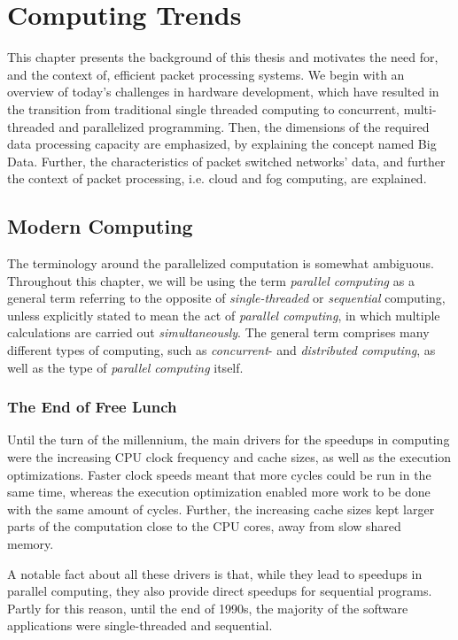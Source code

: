 \chapter{Computing Trends}
\label{chapter:computing-trends}
This chapter presents the background of this thesis and motivates the need for, and the context of, efficient packet processing systems. We begin with an overview of today's challenges in hardware development, which have resulted in the transition from traditional single threaded computing to concurrent, multi-threaded and parallelized programming. Then, the dimensions of the required data processing capacity are emphasized, by explaining the concept named Big Data. Further, the characteristics of packet switched networks' data, and further the context of packet processing, i.e. cloud and fog computing, are explained.

\section{Modern Computing}
The terminology around the parallelized computation is somewhat ambiguous. Throughout this chapter, we will be using the term \emph{parallel computing} as a general term referring to the opposite of \emph{single-threaded} or \emph{sequential} computing, unless explicitly stated to mean the act of \emph{parallel computing}, in which multiple calculations are carried out \emph{simultaneously}. The general term comprises many different types of computing, such as \emph{concurrent}- and \emph{distributed computing}, as well as the type of \emph{parallel computing} itself.

\subsection{The End of Free Lunch}
\label{subsection:the-end-of-free-lunch}
Until the turn of the millennium, the main drivers for the speedups in computing were the increasing CPU clock frequency and cache sizes, as well as the execution optimizations. Faster clock speeds meant that more cycles could be run in the same time, whereas the execution optimization enabled more work to be done with the same amount of cycles. Further, the increasing cache sizes kept larger parts of the computation close to the CPU cores, away from slow shared memory.~\cite{Sutter:2005:FLiO}

A notable fact about all these drivers is that, while they lead to speedups in parallel computing, they also provide direct speedups for sequential programs. Partly for this reason, until the end of 1990s, the majority of the software applications were single-threaded and sequential.~\cite{Sutter:2005:FLiO}

